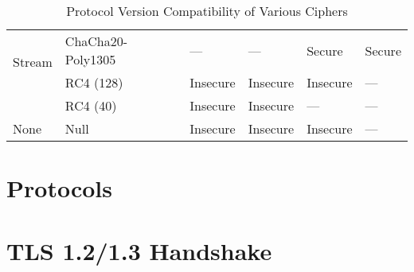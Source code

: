 \documentclass[11pt]{scrartcl} %
\begin{document}
\begin{table}[H]
\begin{tabular}{|p{2cm}|p{3cm}|p{2cm}|p{2cm}|p{2cm}|p{2cm}|}
        \multirow{2}{*}{Stream} & ChaCha20-Poly1305 & — & — & Secure & Secure \\ \cline{2-6}
         & RC4 (128) & Insecure & Insecure & Insecure & — \\ \cline{2-6}
         & RC4 (40) & Insecure & Insecure & — & — \\ \hline
         
        None & Null & Insecure & Insecure & Insecure & — \\ \hline
    \end{tabular}
    \caption{Protocol Version Compatibility of Various Ciphers}
\end{table}


\section{Protocols}




\section{TLS 1.2/1.3 Handshake}
\label{sec:tls_handshake}





	
	
\end{document}
